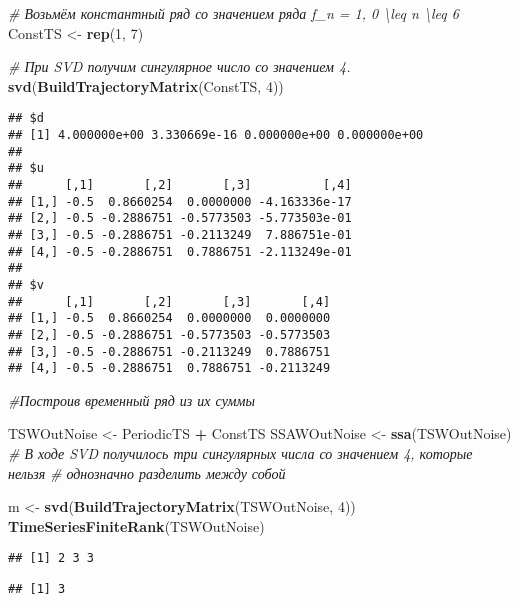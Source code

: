 \documentclass[
]{article}
\newenvironment{Shaded}{\begin{snugshade}}{\end{snugshade}}
\newcommand{\CommentTok}[1]{\textcolor[rgb]{0.56,0.35,0.01}{\textit{#1}}}
\newcommand{\DecValTok}[1]{\textcolor[rgb]{0.00,0.00,0.81}{#1}}
\newcommand{\FunctionTok}[1]{\textcolor[rgb]{0.13,0.29,0.53}{\textbf{#1}}}
\newcommand{\NormalTok}[1]{#1}
\newcommand{\OtherTok}[1]{\textcolor[rgb]{0.56,0.35,0.01}{#1}}
\newcommand{\SpecialCharTok}[1]{\textcolor[rgb]{0.81,0.36,0.00}{\textbf{#1}}}
\begin{document}
\begin{Shaded}
\begin{Highlighting}[]
\CommentTok{\# Возьмём константный ряд со значением ряда f\_n = 1, 0 \textbackslash{}leq n \textbackslash{}leq 6}
\NormalTok{ConstTS }\OtherTok{\textless{}{-}} \FunctionTok{rep}\NormalTok{(}\DecValTok{1}\NormalTok{, }\DecValTok{7}\NormalTok{)}

\CommentTok{\# При SVD получим сингулярное число со значением 4.}
\FunctionTok{svd}\NormalTok{(}\FunctionTok{BuildTrajectoryMatrix}\NormalTok{(ConstTS, }\DecValTok{4}\NormalTok{)) }
\end{Highlighting}
\end{Shaded}

\begin{verbatim}
## $d
## [1] 4.000000e+00 3.330669e-16 0.000000e+00 0.000000e+00
## 
## $u
##      [,1]       [,2]       [,3]          [,4]
## [1,] -0.5  0.8660254  0.0000000 -4.163336e-17
## [2,] -0.5 -0.2886751 -0.5773503 -5.773503e-01
## [3,] -0.5 -0.2886751 -0.2113249  7.886751e-01
## [4,] -0.5 -0.2886751  0.7886751 -2.113249e-01
## 
## $v
##      [,1]       [,2]       [,3]       [,4]
## [1,] -0.5  0.8660254  0.0000000  0.0000000
## [2,] -0.5 -0.2886751 -0.5773503 -0.5773503
## [3,] -0.5 -0.2886751 -0.2113249  0.7886751
## [4,] -0.5 -0.2886751  0.7886751 -0.2113249
\end{verbatim}

\begin{Shaded}
\begin{Highlighting}[]
\CommentTok{\#Построив временный ряд из их суммы}

\NormalTok{TSWOutNoise }\OtherTok{\textless{}{-}}\NormalTok{ PeriodicTS }\SpecialCharTok{+}\NormalTok{ ConstTS }
\NormalTok{SSAWOutNoise }\OtherTok{\textless{}{-}} \FunctionTok{ssa}\NormalTok{(TSWOutNoise) }
\CommentTok{\# В ходе SVD получилось три сингулярных числа со значением 4, которые нельзя}
\CommentTok{\# однозначно разделить между собой}

\NormalTok{m }\OtherTok{\textless{}{-}} \FunctionTok{svd}\NormalTok{(}\FunctionTok{BuildTrajectoryMatrix}\NormalTok{(TSWOutNoise, }\DecValTok{4}\NormalTok{))}
\FunctionTok{TimeSeriesFiniteRank}\NormalTok{(TSWOutNoise)}
\end{Highlighting}
\end{Shaded}

\begin{verbatim}
## [1] 2 3 3
\end{verbatim}

\begin{verbatim}
## [1] 3
\end{verbatim}
\end{document}
